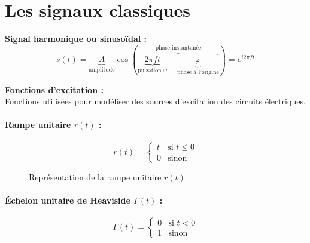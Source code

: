 \documentclass[a4paper,12pt]{article}
\begin{document}
\section{Les signaux classiques}

\textbf{Signal harmonique ou sinusoïdal :} \\
\[ s(t) = \underbrace{A}_{\text{amplitude}} \cos(\overbrace{\underbrace{2\pi ft}_{\text{pulsation }\omega} + \underbrace{\varphi}_{\text{phase à l'origine}}}^{\text{phase instantanée}}) = e^{i2\pi ft}\]

\textbf{Fonctions d'excitation :} \\
Fonctions utilisées pour modéliser des sources d'excitation des circuits électriques.

\paragraph{Rampe unitaire $r(t)$ :}
\[ r(t) =
\begin{cases}
    t & \text{si } t \leq 0 \\
    0 & \text{sinon}
\end{cases} \]

\begin{figure}[!htbp]
	\centering
	\caption{Représentation de la rampe unitaire $r(t)$}
\end{figure}

\paragraph{\'Echelon unitaire de Heaviside $\Gamma(t)$ :}

\[ \Gamma(t) =
\begin{cases}
    0 & \text{si } t < 0 \\
    1 & \text{sinon}
\end{cases} \]
\end{document}
